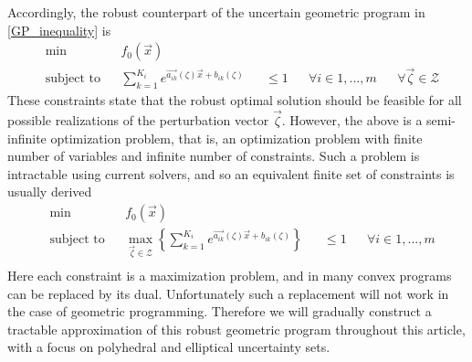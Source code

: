 Accordingly, the robust counterpart of the uncertain geometric program in \eqref{GP_inequality} is
\begin{equation}
\begin{aligned}
& \min &&f_0\left(\vec{x}\right)\\
& \text{subject to} &&\textstyle{\sum}_{k=1}^{K_i}e^{\vec{a_{ik}}\left(\zeta\right)\vec{x} + b_{ik}\left(\zeta\right)} &&\leq 1 &&\forall i \in 1,...,m && \forall \vec{\zeta} \in \mathcal{Z}
\end{aligned}
\label{GP_counterparts}
\end{equation}
These constraints state that the robust optimal solution should be feasible for all possible realizations of the perturbation vector $\vec{\zeta}$. However, the above is a semi-infinite optimization problem, that is, an optimization problem with finite number of variables and infinite number of constraints. Such a problem is intractable using current solvers, and so an equivalent finite set of constraints is usually derived
\begin{equation}
\begin{aligned}
& \min &&f_0\left(\vec{x}\right)\\
& \text{subject to} &&\max_{\vec{\zeta} \in \mathcal{Z}} \left\{\textstyle{\sum}_{k=1}^{K_i}e^{\vec{a_{ik}}\left(\zeta\right)\vec{x} + b_{ik}\left(\zeta\right)}\right\} &&\leq 1 &&\forall i \in 1,...,m\\
\end{aligned}
\label{GP_counterparts_finite}
\end{equation}
Here each constraint is a maximization problem, and in many convex programs can be replaced by its dual. Unfortunately such a replacement will not work in the case of geometric programming. Therefore we will gradually construct a tractable approximation of this robust geometric program throughout this article, with a focus on polyhedral and elliptical uncertainty sets.

